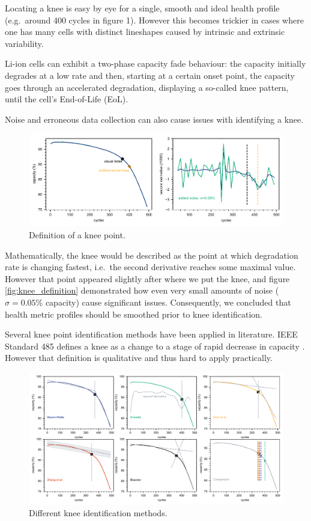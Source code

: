 \documentclass{article}
\begin{document}
Locating a knee is easy by eye for a single, smooth and ideal health profile (e.g.\ around 400 cycles in figure 1). However this becomes trickier in cases where one has many cells with distinct lineshapes caused by intrinsic and extrinsic variability. 

Li-ion cells can exhibit a two-phase capacity fade behaviour: the capacity initially degrades at a low rate and then, starting at a certain onset point, the capacity goes through an accelerated degradation, displaying a so-called knee pattern, until the cell’s End-of-Life (EoL). 

Noise and erroneous data collection can also cause issues with identifying a knee.

\begin{figure}[ht]
\centering
\includegraphics[width=\textwidth]{images/knee_definition.pdf}
\caption{Definition of a knee point.}
\label{fig:knee_definition3}
\end{figure}

Mathematically, the knee would be described as the point at which degradation rate is changing fastest, i.e.\ the second derivative reaches some maximal value. However that point appeared slightly after where we put the knee, and figure \ref{fig:knee_definition} demonstrated how even very small amounts of noise ($\sigma=0.05\%$ capacity) cause significant issues. Consequently, we concluded that health metric profiles should be smoothed prior to knee identification.

Several knee point identification methods have been applied in literature. IEEE Standard 485 defines a knee as a change to a stage of rapid decrease in capacity \cite{noauthor_ieee_2011}. However that definition is qualitative and thus hard to apply practically.

\begin{figure}[ht]
\centering
\includegraphics[width=\textwidth]{images/knee_identification_methods.pdf}
\caption{Different knee identification methods.}
\label{fig:knee_identification_methods}
\end{figure}
\end{document}
